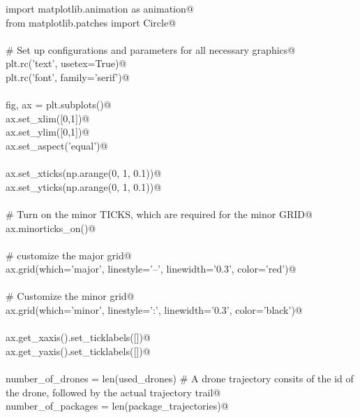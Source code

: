 \documentclass[10.0pt]{report}
\begin{document}
\begin{appendices}
\begin{flushleft}
\begin{list}{}{}
\mbox{}\verb@    import matplotlib.animation as animation@\\
\mbox{}\verb@    from   matplotlib.patches import Circle@\\
\mbox{}\verb@@\\
\mbox{}\verb@    # Set up configurations and parameters for all necessary graphics@\\
\mbox{}\verb@    plt.rc('text', usetex=True)@\\
\mbox{}\verb@    plt.rc('font', family='serif')@\\
\mbox{}\verb@@\\
\mbox{}\verb@    fig, ax = plt.subplots()@\\
\mbox{}\verb@    ax.set_xlim([0,1])@\\
\mbox{}\verb@    ax.set_ylim([0,1])@\\
\mbox{}\verb@    ax.set_aspect('equal')@\\
\mbox{}\verb@@\\
\mbox{}\verb@    ax.set_xticks(np.arange(0, 1, 0.1))@\\
\mbox{}\verb@    ax.set_yticks(np.arange(0, 1, 0.1))@\\
\mbox{}\verb@@\\
\mbox{}\verb@    # Turn on the minor TICKS, which are required for the minor GRID@\\
\mbox{}\verb@    ax.minorticks_on()@\\
\mbox{}\verb@@\\
\mbox{}\verb@    # customize the major grid@\\
\mbox{}\verb@    ax.grid(which='major', linestyle='--', linewidth='0.3', color='red')@\\
\mbox{}\verb@@\\
\mbox{}\verb@    # Customize the minor grid@\\
\mbox{}\verb@    ax.grid(which='minor', linestyle=':', linewidth='0.3', color='black')@\\
\mbox{}\verb@@\\
\mbox{}\verb@    ax.get_xaxis().set_ticklabels([])@\\
\mbox{}\verb@    ax.get_yaxis().set_ticklabels([])@\\
\mbox{}\verb@@\\
\mbox{}\verb@    number_of_drones   = len(used_drones) # A drone trajectory consits of the id of the drone, followed by the actual trajectory trail@\\
\mbox{}\verb@    number_of_packages = len(package_trajectories)@\\

\end{list}
\end{flushleft}
\end{appendices}
\end{document}

